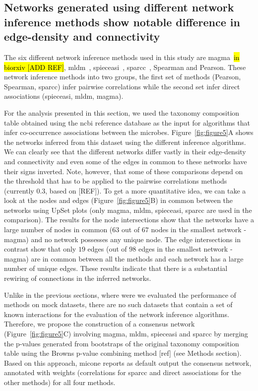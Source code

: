   \FloatBarrier

  \subsection*{Networks generated using different network inference methods show notable difference in edge-density and connectivity}

  The six different network inference methods used in this study are \ac{magma}~\hl{in biorxiv [ADD REF]}, \ac{mldm}~\cite{Yang2017}, \ac{spieceasi}~\cite{Kurtz2015}, \ac{sparcc}~\cite{Friedman2012}, Spearman and Pearson.
  These network inference methods into two groups, the first set of methods (Pearson, Spearman, \ac{sparcc}) infer pairwise correlations while the second set infer direct associations (\ac{spieceasi}, \ac{mldm}, \ac{magma}).

  For the analysis presented in this section, we used the taxonomy composition table obtained using the \ac{ncbi} reference database as the input for algorithms that infer co-occurrence associations between the microbes.
  Figure~\ref{fig:figure5}A shows the networks inferred from this dataset using the different inference algorithms.
  We can clearly see that the different networks differ vastly in their edge-density and connectivity and even some of the edges in common to these networks have their signs inverted. Note, however, that some of these comparisons depend on the threshold that has to be applied to the pairwise correlations methods (currently 0.3, based on [REF]).
  To get a more quantitative idea, we can take a look at the nodes and edges (Figure~\ref{fig:figure5}B) in common between the networks using UpSet plots (only \ac{magma}, \ac{mldm}, \ac{spieceasi}, \ac{sparcc} are used in the comparison).
  The results for the node intersections show that the networks have a large number of nodes in common ($63$ out of $67$ nodes in the smallest network - \ac{magma}) and no network possesses any unique node.
  The edge intersections in contrast show that only $19$ edges (out of $98$ edges in the smallest network - \ac{magma}) are in common between all the methods and each network has a large number of unique edges.
  These results indicate that there is a substantial rewiring of connections in the inferred networks.

  Unlike in the previous sections, where were we evaluated the performance of methods on mock datasets, there are no such datasets that contain a set of known interactions for the evaluation of the network inference algorithms.
  Therefore, we propose the construction of a consensus network (Figure~\ref{fig:figure5}C) involving \ac{magma}, \ac{mldm}, \ac{spieceasi} and \ac{sparcc} by merging the p-values generated from bootstraps of the original taxonomy composition table using the Browns p-value combining method [ref] (see Methods section).
  Based on this approach, \ac{micone} reports as default output the consensus network, annotated with weights (correlations for \ac{sparcc} and direct associations for the other methods) for all four methods.

